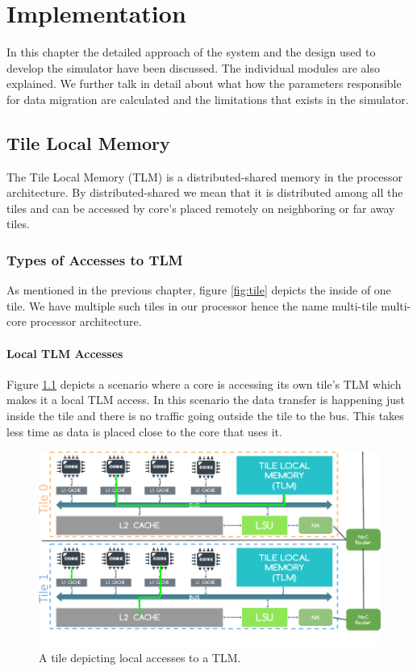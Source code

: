 \documentclass{listhesis}
\begin{document}
\chapter{Implementation}
In this chapter the detailed approach of the system and the design used to develop the simulator have been discussed. The individual modules are also explained. We further talk in detail about what how the parameters responsible for data migration are calculated and the limitations that exists in the simulator. 
\section{Tile Local Memory}
The Tile Local Memory (TLM) is a distributed-shared memory in the processor architecture. By distributed-shared we mean that it is distributed among all the tiles and can be accessed by core's placed remotely on neighboring or far away tiles. 
\subsection{Types of Accesses to TLM}
As mentioned in the previous chapter, figure \ref{fig:tile} depicts the inside of one tile. We have multiple such tiles in our processor hence the name multi-tile multi-core processor architecture.
\subsubsection{Local TLM Accesses}
Figure \ref{fig:localaccesses} depicts a scenario where a core is accessing its own tile's TLM which makes it a local TLM access. In this scenario the data transfer is happening just inside the tile and there is no traffic going outside the tile to the bus. This takes less time as data is placed close to the core that uses it. 
\begin{figure}
  \includegraphics[width=\linewidth]{localaccesses.png}
  \centering
  \caption{A tile depicting local accesses to a TLM.}
  \label{fig:localaccesses}
\end{figure}
\end{document}
